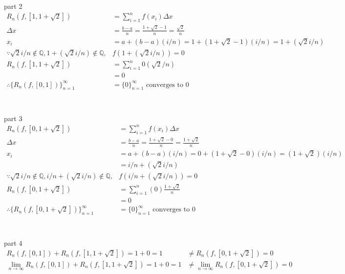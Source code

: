 \documentclass[12pt, border = 4pt, multi]{article} %
\begin{document}
\\
\\
part 2
\begin{align*}
R_n(f, [1, 1 + \sqrt{2}]) &= \sum_{i = 1} ^ n f(x_i) \Delta x\\
\Delta x &= \frac{b - a}{n} = \frac{1 + \sqrt{2} - 1}{n} = \frac{\sqrt{2}}{n}\\
x_i &= a + (b - a)(i / n) = 1 + (1 + \sqrt{2} - 1)(i / n) = 1 + (\sqrt{2}i / n)\\
\because \sqrt{2}i / n \not\in \mathbb{Q}, 1 + (\sqrt{2}i / n) \not\in \mathbb{Q}, &f(1 + (\sqrt{2}i / n)) = 0\\
R_n(f, [1, 1 + \sqrt{2}]) &= \sum_{i = 1} ^ n 0 (\sqrt{2} / n)\\
&= 0\\
\therefore \{R_n(f, [0, 1])\}_{n = 1} ^ {\infty} &= \{0\}_{n = 1} ^ {\infty} \text{ converges to 0}\\
\end{align*}
\\
\\
part 3
\begin{align*}
R_n(f, [0, 1 + \sqrt{2}]) &= \sum_{i = 1} ^ n f(x_i) \Delta x\\
\Delta x &= \frac{b - a}{n} = \frac{1 + \sqrt{2} - 0}{n} = \frac{1 + \sqrt{2}}{n}\\
x_i &= a + (b - a)(i / n) = 0 + (1 + \sqrt{2} - 0)(i / n) = (1 + \sqrt{2})(i / n)\\
&= i / n + (\sqrt{2}i / n)\\
\because \sqrt{2}i / n \not\in \mathbb{Q}, i / n + (\sqrt{2}i / n) \not\in \mathbb{Q}, &f(i / n + (\sqrt{2}i / n)) = 0\\
R_n(f, [0, 1 + \sqrt{2}]) &= \sum_{i = 1} ^ n (0) \frac{1 + \sqrt{2}}{n}\\
&= 0\\
\therefore \{R_n(f, [0, 1 + \sqrt{2}])\}_{n = 1} ^ {\infty} &= \{0\}_{n = 1} ^ {\infty} \text{ converges to 0}\\
\end{align*}
\\
\\
part 4
\begin{align*}
R_n(f, [0, 1]) + R_n(f, [1, 1 + \sqrt{2}]) = 1 + 0 = 1 &\not= R_n(f, [0, 1 + \sqrt{2}]) = 0\\
\lim_{n \rightarrow \infty} R_n(f, [0, 1]) + R_n(f, [1, 1 + \sqrt{2}]) = 1 + 0 = 1 &\not= \lim_{n \rightarrow \infty}  R_n(f, [0, 1 + \sqrt{2}]) = 0\\
\end{align*}
\end{document}
